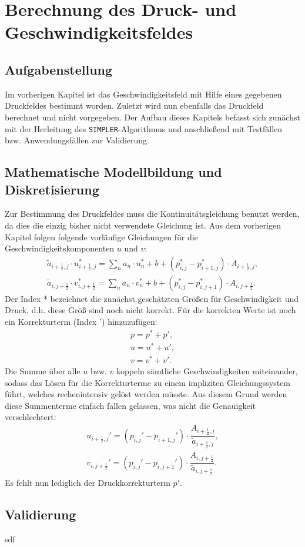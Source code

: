 \chapter{Berechnung des Druck- und Geschwindigkeitsfeldes}

\section{Aufgabenstellung}
Im vorherigen Kapitel ist das Geschwindigkeitsfeld mit Hilfe eines gegebenen Druckfeldes bestimmt worden. Zuletzt wird nun ebenfalls das Druckfeld berechnet und nicht vorgegeben. Der Aufbau dieses Kapitels befasst sich zun\"achst mit der Herleitung des \texttt{SIMPLER}-Algorithmus und anschlie\ss{}end mit Testf\"allen bzw. Anwendungsf\"allen zur Validierung. 


\section{Mathematische Modellbildung und Diskretisierung}
Zur Bestimmung des Druckfeldes muss die Kontinuit\"atsgleichung benutzt werden, da dies die einzig bisher nicht verwendete Gleichung ist. Aus dem vorherigen Kapitel folgen folgende vorl\"aufige Gleichungen f\"ur die Geschwindigkeitskomponenten $u$ und $v$:
\begin{align}
\tilde{a}_{i+\frac{1}{2},j}\cdot u_{i+\frac{1}{2},j}^{*}=\sum\limits_{n}a_{n}\cdot u_{n}^{*} + b + \left(p_{i,j}^{*}-p_{i+1,j}^{*}\right)\cdot A_{i+\frac{1}{2},j}, \\
\tilde{a}_{i,j+\frac{1}{2}}\cdot v_{i,j+\frac{1}{2}}^{*}=\sum\limits_{n}a_{n}\cdot v_{n}^{*} + b + \left(p_{i,j}^{*}-p_{i,j+1}^{*}\right)\cdot A_{i,j+\frac{1}{2}}.
\end{align}
Der Index * bezeichnet die zun\"achst gesch\"atzten Gr\"o\ss{}en f\"ur Geschwindigkeit und Druck, d.h. diese Gr\"o\ss{} sind noch nicht korrekt. F\"ur die korrekten Werte ist noch ein Korrekturterm (Index ') hinzuzuf\"ugen:
\begin{align}
p=p^{*}+p', \\
u=u^{*}+u', \\
v=v^{*}+v'.
\end{align}
Die Summe \"uber alle $u$ bzw. $v$ koppeln s\"amtliche Geschwindigkeiten miteinander, sodass das L\"osen f\"ur die Korrekturterme zu einem impliziten Gleichungssystem f\"uhrt, welches rechenintensiv gel\"ost werden m\"usste. Aus diesem Grund werden diese Summenterme einfach fallen gelassen, was nicht die Genauigkeit verschlechtert:
\begin{align}
u_{i+\frac{1}{2},j}'= \left(p_{i,j}'-p_{i+1,j}'\right)\cdot \dfrac{A_{i+\frac{1}{2},j}}{\tilde{a}_{i+\frac{1}{2},j}}, \\
v_{i,j+\frac{1}{2}}'= \left(p_{i,j}'-p_{i,j+1}'\right)\cdot \dfrac{A_{i,j+\frac{1}{2}}}{\tilde{a}_{i,j+\frac{1}{2}}}.
\end{align}
Es fehlt nun lediglich der Druckkorrekturterm $p'$.

\section{Validierung}
sdf
